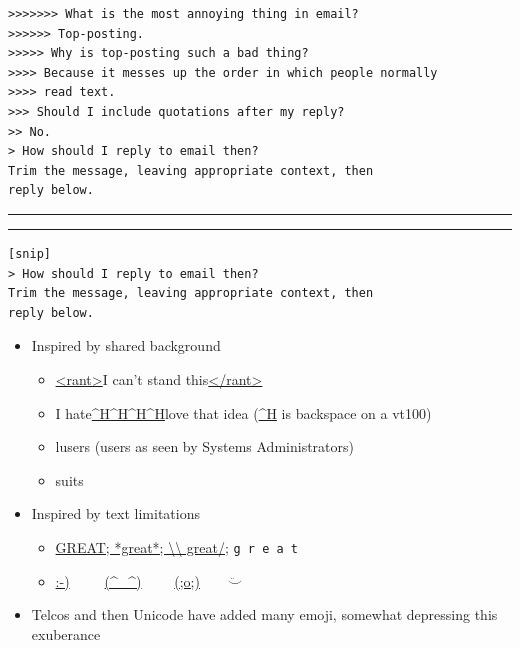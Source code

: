 \documentclass[a4paper,landscape,headrule,footrule,xetex]{foils}
\begin{document}
\begin{verbatim}
>>>>>>> What is the most annoying thing in email?
>>>>>> Top-posting.
>>>>> Why is top-posting such a bad thing?
>>>> Because it messes up the order in which people normally 
>>>> read text.
>>> Should I include quotations after my reply?
>> No.
> How should I reply to email then?
Trim the message, leaving appropriate context, then 
reply below.
\end{verbatim}
\hrule \hrule
\begin{verbatim}
[snip]
> How should I reply to email then?
Trim the message, leaving appropriate context, then  
reply below.
\end{verbatim}







\begin{quote}
\end{quote}

\begin{itemize}
\item Inspired by shared background
  \begin{itemize}
  \item \url{<rant>}I can't stand this\url{</rant>}
  \item I hate\url{^H^H^H^H}love that idea \hfill (\url{^H} is backspace on a vt100)
  \item lusers (users as seen by Systems Administrators)
  \item suits
  \end{itemize}
\item Inspired by text limitations
  \begin{itemize}
  \item \url{GREAT; *great*; \\
great/;} \texttt{g\ r\ e\ a\ t}
  \item \url{:-)}\ \ \ \ \ \url{(^_^)} \ \ \ \  \url{(;o;)}\ \ \ \ $\ddot\smile$
  \end{itemize}
\item Telcos and then Unicode have added many emoji, somewhat
  depressing this exuberance
\end{itemize}



\end{document}
